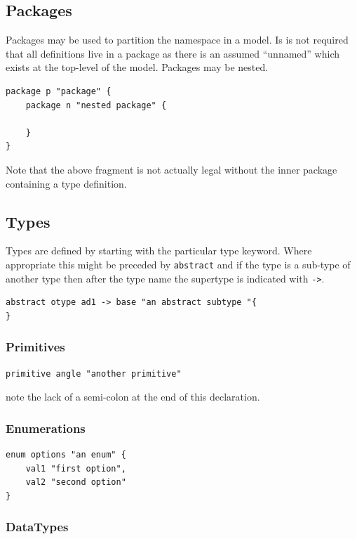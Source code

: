 \documentclass[11pt,a4paper]{ivoa}
\begin{document}
\subsection{Packages}
Packages may be used to partition the namespace in a model. Is is not required that all definitions live in a package as there is an assumed ``unnamed'' 
which exists at the top-level of the model. Packages may be nested.
\begin{lstlisting}[language=vodsl]
package p "package" {
	package n "nested package" {
   
	}
}
\end{lstlisting}

Note that the above fragment is not actually legal without the inner package containing a type definition.

\subsection{Types}

Types are defined by starting with the particular type keyword. Where appropriate this might be preceded by \lstinline{abstract} and
if the type is a sub-type of another type then after the type name the supertype is indicated with \lstinline{->}.

\begin{lstlisting}
abstract otype ad1 -> base "an abstract subtype "{	
}
\end{lstlisting}

\subsubsection{Primitives}
\begin{lstlisting}[language=vodsl]
primitive angle "another primitive"
\end{lstlisting}
note the lack of a semi-colon at the end of this declaration.

\subsubsection{Enumerations}
\begin{lstlisting}[language=vodsl]
enum options "an enum" {
	val1 "first option",
	val2 "second option"
}   

\end{lstlisting}

\subsubsection{DataTypes}
\end{document}
